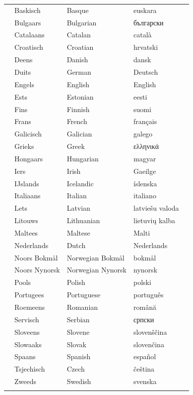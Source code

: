 \documentclass[]{../../metanetpaper}
\begin{document}
\cleardoublepage

\label{whitepaperseries}

\vspace*{-5mm}
\centering
  \setlength{\tabcolsep}{2.5em}
  \begin{tabularx}{\textwidth}{lllll} \toprule\addlinespace
  &Baskisch & Basque & euskara& \\
  &Bulgaars & Bulgarian & български& \\
  &Catalaans & Catalan & català& \\
  &Croatisch & Croatian & hrvatski& \\
&Deens & Danish & dansk& \\
  &Duits & German & Deutsch& \\
  &Engels & English & English& \\
  &Ests & Estonian & eesti& \\
  &Fins & Finnish & suomi& \\
  &Frans & French & français& \\
  &Galicisch & Galician & galego& \\
  &Grieks & Greek & ελληνικά& \\
  &Hongaars & Hungarian & magyar& \\
  &Iers & Irish & Gaeilge& \\
  &IJslands & Icelandic & íslenska& \\
  &Italiaans & Italian & italiano& \\
  &Lets & Latvian & latviešu valoda& \\
  &Litouws & Lithuanian & lietuvių kalba& \\
  &Maltees & Maltese & Malti& \\
  &Nederlands & Dutch & Nederlands& \\
  &Noors Bokmål & Norwegian Bokmål & bokmål& \\
  &Noors Nynorsk & Norwegian Nynorsk & nynorsk& \\
  &Pools & Polish & polski& \\
  &Portugees & Portuguese & português& \\
  &Roemeens & Romanian & română& \\
  &Servisch & Serbian & српски& \\
  &Sloveens & Slovene & slovenščina& \\
  &Slowaaks & Slovak & slovenčina& \\
  &Spaans & Spanish & español& \\
  &Tsjechisch & Czech & čeština& \\
  &Zweeds & Swedish & svenska& \\
\addlinespace \bottomrule
\end{tabularx}
\end{document}
